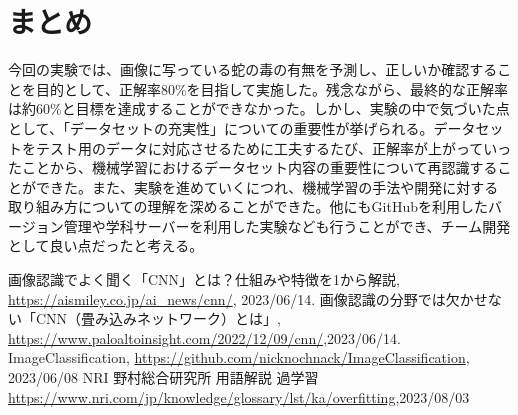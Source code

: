 \documentclass[a4paper, 11pt, titlepage]{jsarticle}
\begin{document}
\section{まとめ}
今回の実験では、画像に写っている蛇の毒の有無を予測し、正しいか確認することを目的として、正解率80\%を目指して実施した。残念ながら、最終的な正解率は約60\%と目標を達成することができなかった。しかし、実験の中で気づいた点として、「データセットの充実性」についての重要性が挙げられる。データセットをテスト用のデータに対応させるために工夫するたび、正解率が上がっていったことから、機械学習におけるデータセット内容の重要性について再認識することができた。また、実験を進めていくにつれ、機械学習の手法や開発に対する取り組み方についての理解を深めることができた。他にもGitHubを利用したバージョン管理や学科サーバーを利用した実験なども行うことができ、チーム開発として良い点だったと考える。

\begin{thebibliography}{n}
	画像認識でよく聞く「CNN」とは？仕組みや特徴を1から解説, \url{https://aismiley.co.jp/ai_news/cnn/}, 2023/06/14.
	画像認識の分野では欠かせない「CNN（畳み込みネットワーク）とは」, \url{https://www.paloaltoinsight.com/2022/12/09/cnn/},2023/06/14.
	ImageClassification, \url{https://github.com/nicknochnack/ImageClassification}, 2023/06/08
	NRI 野村総合研究所 用語解説 過学習\url{https://www.nri.com/jp/knowledge/glossary/lst/ka/overfitting},2023/08/03
\end{thebibliography}
\end{document}
